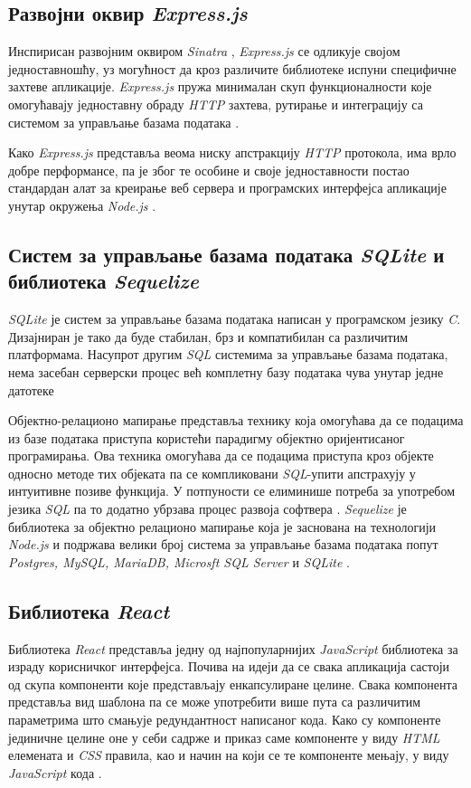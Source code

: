 \documentclass[12pt,oneside]{memoir}
\begin{document}
\subsection{Развојни оквир \textit{Express.js}}

Инспирисан развојним оквиром \textit{Sinatra} \cite{sinatra}, \textit{Express.js} се одликује својом једноставношћу, уз могућност да кроз различите библиотеке испуни специфичне захтеве апликације. \textit{Express.js} пружа минималан скуп функционалности које омогућавају једноставну обраду \textit{HTTP} захтева, рутирање и интеграцију са системом за управљање базама података \cite{express}. 

Како \textit{Express.js} представља веома ниску апстракцију \textit{HTTP} протокола, има врло добре перформансе, па је због те особине и своје једноставности постао стандардан алат за креирање веб сервера и програмских интерфејса апликације унутар окружења \textit{Node.js } \cite{mdnexpress}.

\subsection{Систем за управљање базама података \textit{SQLite} и библиотека \textit{Sequelize}}

\textit{SQLite} је систем за управљање базама података написан у програмском језику \textit{C}. Дизајниран је тако да буде стабилан, брз и компатибилан са различитим платформама.  Насупрот другим \textit{SQL} системима за управљање базама података, нема засебан серверски процес већ комплетну базу података чува унутар једне датотеке \cite{sqlite,sqlitetutorial}

Објектно-релационо мапирање представља технику која омогућава да се подацима из базе података приступа користећи парадигму објектно оријентисаног програмирања. Ова техника омогућава да се подацима приступа кроз објекте односно методе тих објеката па се компликовани \textit{SQL}-упити апстрахују у интуитивне позиве функција. У потпуности се елиминише потреба за употребом језика \textit{SQL} па то додатно убрзава процес развоја софтвера \cite{orm}. \textit{Sequelize} је библиотека за објектно релационо мапирање која је заснована на технологији \textit{ Node.js} и подржава велики број система за управљање базама података попут \textit{Postgres, MySQL, MariaDB, Microsft SQL Server} и \textit{SQLite} \cite{sequelize}.

\subsection{Библиотека \textit{React}}
\label{section:react}
Библиотека \textit{React} представља једну од најпопуларнијих \textit{JavaScript} библиотека за израду корисничког интерфејса.  Почива на идеји да се свака апликација састоји од скупа компоненти које представљају енкапсулиране целине. Свака компонента представља вид шаблона па се може употребити више пута са различитим параметрима што смањује редундантност написаног кода. Како су компоненте јединичне целине оне у себи садрже и приказ саме компоненте у виду \textit{HTML} елемената и \textit{CSS} правила, као и начин на који се те компоненте мењају, у виду \textit{JavaScript} кода \cite{react}.
\end{document}
